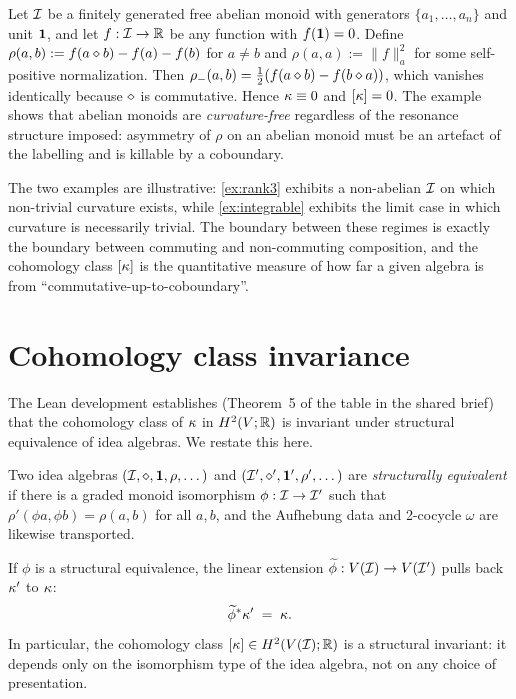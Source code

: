 \begin{example}\label{ex:integrable}
Let $\mathcal{I}$ be a finitely generated free abelian monoid with generators
$\{a_1,\dots,a_n\}$ and unit $\mathbf{1}$, and let $f:\mathcal{I}\to\mathbb{R}$ be any
function with $f(\mathbf{1})=0$. Define
$\rho(a,b):=f(a\mathbin{\diamond} b)-f(a)-f(b)$ for $a\ne b$ and
$\rho(a,a):=\|f\|_a^2$ for some self-positive normalization. Then
$\rho_-(a,b)=\tfrac12(f(a\mathbin{\diamond} b)-f(b\mathbin{\diamond} a))$, which vanishes
identically because $\mathbin{\diamond}$ is commutative. Hence $\kappa\equiv 0$ and
$[\kappa]=0$. The example shows that abelian monoids are
\emph{curvature-free} regardless of the resonance structure imposed:
asymmetry of $\rho$ on an abelian monoid must be an artefact of the
labelling and is killable by a coboundary.
\end{example}

The two examples are illustrative: \cref{ex:rank3} exhibits a non-abelian
$\mathcal{I}$ on which non-trivial curvature exists, while \cref{ex:integrable}
exhibits the limit case in which curvature is necessarily trivial. The
boundary between these regimes is exactly the boundary between commuting
and non-commuting composition, and the cohomology class $[\kappa]$ is the
quantitative measure of how far a given algebra is from
``commutative-up-to-coboundary''.

\section{Cohomology class invariance}\label{sec:cohomology}

The Lean development establishes (Theorem~5 of the table in the shared
brief) that the cohomology class of $\kappa$ in $H^2(V;\mathbb{R})$ is invariant
under structural equivalence of idea algebras. We restate this here.

\begin{definition}\label{def:struct-equiv}
Two idea algebras
$(\mathcal{I},\mathbin{\diamond},\mathbf{1},\rho,\dots)$ and
$(\mathcal{I}',\mathbin{\diamond}',\mathbf{1}',\rho',\dots)$ are \emph{structurally equivalent}
if there is a graded monoid isomorphism $\phi:\mathcal{I}\to\mathcal{I}'$ such that
$\rho'(\phi a,\phi b)=\rho(a,b)$ for all $a,b$, and the Aufhebung data and
2-cocycle $\omega$ are likewise transported.
\end{definition}

\begin{theorem}\label{thm:cohom-inv}
If $\phi$ is a structural equivalence, the linear extension
$\widetilde\phi:V(\mathcal{I})\to V(\mathcal{I}')$ pulls back $\kappa'$ to $\kappa$:
\[
\widetilde\phi^*\kappa' \;=\; \kappa.
\]
In particular, the cohomology class $[\kappa]\in H^2(V(\mathcal{I});\mathbb{R})$ is a
structural invariant: it depends only on the isomorphism type of the idea
algebra, not on any choice of presentation.
\end{theorem}

